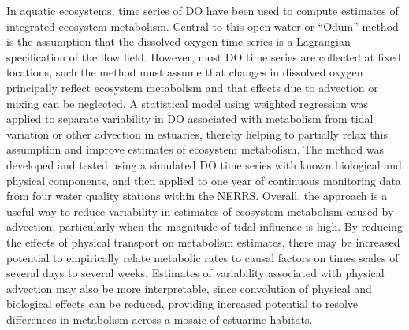 In aquatic ecosystems, time series of \ac{DO} have been used to compute estimates of integrated ecosystem metabolism.  Central to this open water or ``Odum'' method is the assumption that the dissolved oxygen time series is a Lagrangian specification of the flow field.  However, most \ac{DO} time series are collected at fixed locations, such the method must assume that changes in dissolved oxygen principally reflect ecosystem metabolism and that effects due to advection or mixing can be neglected.  A statistical model using weighted regression was applied to separate variability in \ac{DO} associated with metabolism from tidal variation or other advection in estuaries, thereby helping to partially relax this assumption and improve estimates of ecosystem metabolism. The method was developed and tested using a simulated \ac{DO} time series with known biological and physical components, and then applied to one year of continuous monitoring data from four water quality stations within the \acl*{NERRS}.  Overall, the approach is a useful way to reduce variability in estimates of ecosystem metabolism caused by advection, particularly when the magnitude of tidal influence is high. By reducing the effects of physical transport on metabolism estimates, there may be increased potential to empirically relate metabolic rates to causal factors on times scales of several days to several weeks. Estimates of variability associated with physical advection may also be more interpretable, since convolution of physical and biological effects can be reduced, providing increased potential to resolve differences in metabolism across a mosaic of estuarine habitats.  